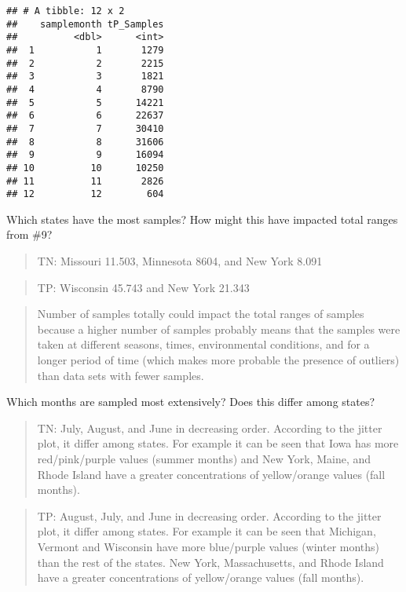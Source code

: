 \documentclass[]{article}
\begin{document}
\begin{verbatim}
## # A tibble: 12 x 2
##    samplemonth tP_Samples
##          <dbl>      <int>
##  1           1       1279
##  2           2       2215
##  3           3       1821
##  4           4       8790
##  5           5      14221
##  6           6      22637
##  7           7      30410
##  8           8      31606
##  9           9      16094
## 10          10      10250
## 11          11       2826
## 12          12        604
\end{verbatim}

Which states have the most samples? How might this have impacted total
ranges from \#9?

\begin{quote}
TN: Missouri 11.503, Minnesota 8604, and New York 8.091
\end{quote}

\begin{quote}
TP: Wisconsin 45.743 and New York 21.343
\end{quote}

\begin{quote}
Number of samples totally could impact the total ranges of samples
because a higher number of samples probably means that the samples were
taken at different seasons, times, environmental conditions, and for a
longer period of time (which makes more probable the presence of
outliers) than data sets with fewer samples.
\end{quote}

Which months are sampled most extensively? Does this differ among
states?

\begin{quote}
TN: July, August, and June in decreasing order. According to the jitter
plot, it differ among states. For example it can be seen that Iowa has
more red/pink/purple values (summer months) and New York, Maine, and
Rhode Island have a greater concentrations of yellow/orange values (fall
months).
\end{quote}

\begin{quote}
TP: August, July, and June in decreasing order. According to the jitter
plot, it differ among states. For example it can be seen that Michigan,
Vermont and Wisconsin have more blue/purple values (winter months) than
the rest of the states. New York, Massachusetts, and Rhode Island have a
greater concentrations of yellow/orange values (fall months).
\end{quote}
\end{document}
